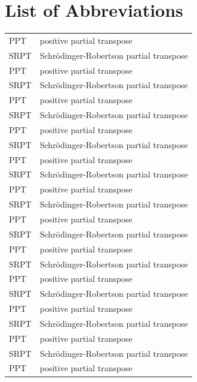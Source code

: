 \chapter*{List of Abbreviations}

\setlength\LTleft{0pt}
\setlength\LTright{0pt}
\begin{xltabular}{\textwidth}{@{}l X@{}}
    PPT  & positive partial transpose                \\
    SRPT & Schr\"odinger-Robertson partial transpose \\
    PPT  & positive partial transpose                \\
    SRPT & Schr\"odinger-Robertson partial transpose \\
    PPT  & positive partial transpose                \\
    SRPT & Schr\"odinger-Robertson partial transpose \\
    PPT  & positive partial transpose                \\
    SRPT & Schr\"odinger-Robertson partial transpose \\
    PPT  & positive partial transpose                \\
    SRPT & Schr\"odinger-Robertson partial transpose \\
    PPT  & positive partial transpose                \\
    SRPT & Schr\"odinger-Robertson partial transpose \\
    PPT  & positive partial transpose                \\
    SRPT & Schr\"odinger-Robertson partial transpose \\
    PPT  & positive partial transpose                \\
    SRPT & Schr\"odinger-Robertson partial transpose \\
    PPT  & positive partial transpose                \\
    SRPT & Schr\"odinger-Robertson partial transpose \\
    PPT  & positive partial transpose                \\
    SRPT & Schr\"odinger-Robertson partial transpose \\
    PPT  & positive partial transpose                \\
    SRPT & Schr\"odinger-Robertson partial transpose \\
    PPT  & positive partial transpose                \\

\end{xltabular}
